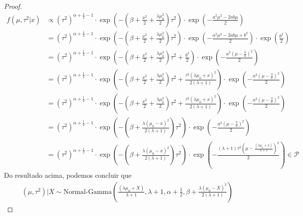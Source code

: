 \begin{proof}
 \begin{align*}
  f(\mu,\tau^{2}|x) &\propto (\tau^{2})^{\alpha+\frac{1}{2}-1} \cdot \exp\left(-\left(\beta + \frac{x^{2}}{2} + \frac{\lambda\mu_{0}^{2}}{2}\right)\tau^{2}\right) \cdot \exp\left(-\frac{a^{2}\mu^{2}-2ab\mu}{2}\right) \\
  &= (\tau^{2})^{\alpha+\frac{1}{2}-1} \cdot \exp\left(-\left(\beta + \frac{x^{2}}{2} + \frac{\lambda\mu_{0}^{2}}{2}\right)\tau^{2}\right) \cdot \exp\left(-\frac{a^{2}\mu^{2}-2ab\mu+b^{2}}{2}\right) \cdot \exp\left(\frac{b^{2}}{2}\right) \\
  &= (\tau^{2})^{\alpha+\frac{1}{2}-1} \cdot \exp\left(-\left(\beta + \frac{x^{2}}{2} + \frac{\lambda\mu_{0}^{2}}{2}\right)\tau^{2} + \frac{b^{2}}{2}\right) \cdot \exp\left(-\frac{a^{2}\left(\mu-\frac{b}{a}\right)^{2}}{2}\right) \\
  &= (\tau^{2})^{\alpha+\frac{1}{2}-1} \cdot \exp\left(-\left(\beta + \frac{x^{2}}{2} + \frac{\lambda\mu_{0}^{2}}{2}\right)\tau^{2} + \frac{\tau^{2} (\lambda\mu_{0}+x)^{2}}{2(\lambda+1)}\right) \cdot \exp\left(-\frac{a^{2}\left(\mu-\frac{b}{a}\right)^{2}}{2}\right) \\
  &= (\tau^{2})^{\alpha+\frac{1}{2}-1} \cdot \exp\left(-\left(\beta + \frac{x^{2}}{2} + \frac{\lambda\mu_{0}^{2}}{2}\right)\tau^{2} + \frac{\tau^{2} (\lambda\mu_{0}+x)^{2}}{2(\lambda+1)}\right) \cdot \exp\left(-\frac{a^{2}\left(\mu-\frac{b}{a}\right)^{2}}{2}\right) \\
  &= (\tau^{2})^{\alpha+\frac{1}{2}-1} \cdot \exp\left(-\left(\beta + \frac{\lambda(\mu_{0}-x)^{2}}{2(\lambda+1)}\right)\tau^{2}\right) \cdot \exp\left(-\frac{a^{2}\left(\mu-\frac{b}{a}\right)^{2}}{2}\right)	\\
  &= (\tau^{2})^{\alpha+\frac{1}{2}-1} \cdot \exp\left(-\left(\beta + \frac{\lambda(\mu_{0}-x)^{2}}{2(\lambda+1)}\right)\tau^{2}\right) \cdot \exp\left(-\frac{(\lambda+1)\tau^{2}\left(\mu-\frac{(\lambda\mu_{0}+x)}{\lambda+1}\right)^{2}}{2}\right) \in \mathcal{P}
 \end{align*}
 Do resultado acima, podemos concluir que
 \begin{align*}
  (\mu,\tau^{2})|X \sim \text{Normal-Gamma}\left(\frac{(\lambda\mu_{0}+X)}{\lambda+1}, \lambda+1, \alpha+\frac{1}{2}, \beta + \frac{\lambda(\mu_{0}-X)^{2}}{2(\lambda+1)} \right)
 \end{align*}
\end{proof}

